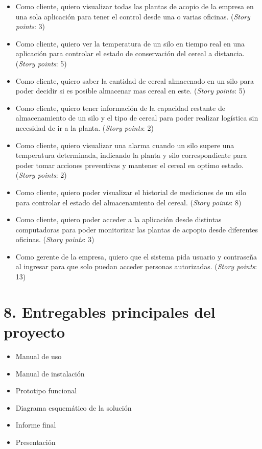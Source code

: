 \documentclass[
11pt, %
]{charter}
\begin{document}
\begin{itemize}
\item Como cliente, quiero visualizar todas las plantas de acopio de la empresa en una sola aplicación para tener el control desde una o varias oficinas. (\textit{Story points}: 3)

\item Como cliente, quiero ver la temperatura de un silo en tiempo real en una aplicación para controlar el estado de conservación del cereal a distancia. (\textit{Story points}: 5)

\item Como cliente, quiero saber la cantidad de cereal almacenado en un silo para poder decidir si es posible almacenar mas cereal en este.  (\textit{Story points}: 5)

\item Como cliente, quiero tener información de la capacidad restante de almacenamiento de un silo y el tipo de cereal para poder realizar logística sin necesidad de ir a la planta. (\textit{Story points}: 2)

\item Como cliente, quiero visualizar una alarma cuando un silo supere una temperatura determinada, indicando la planta y silo correspondiente para poder tomar acciones preventivas y mantener el cereal en optimo estado. (\textit{Story points}: 2)

\item Como cliente, quiero poder visualizar el historial de mediciones de un silo para controlar el estado del almacenamiento del cereal. (\textit{Story points}: 8)

\item Como cliente, quiero poder acceder a la aplicación desde distintas computadoras para poder monitorizar las plantas de acpopio desde diferentes oficinas. (\textit{Story points}: 3)

\item Como gerente de la empresa, quiero que el sistema pida usuario y contraseña al ingresar para que solo puedan acceder personas autorizadas. (\textit{Story points}: 13)
\end{itemize}

\section{8. Entregables principales del proyecto}
\label{sec:entregables}

\begin{itemize}
	\item Manual de uso
	\item Manual de instalación
	\item Prototipo funcional
	\item Diagrama esquemático de la solución
	\item Informe final
	\item Presentación
\end{itemize}
\end{document}
